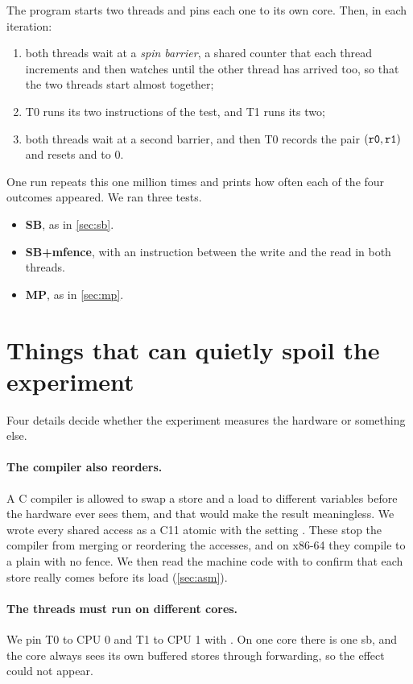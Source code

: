 The program starts two threads and pins each one to its own core. Then, in each iteration:
\begin{enumerate}
\item both threads wait at a \emph{spin barrier}, a shared counter that each thread increments and then watches until the other thread has arrived too, so that the two threads start almost together;
\item T0 runs its two instructions of the test, and T1 runs its two;
\item both threads wait at a second barrier, and then T0 records the pair $(\texttt{r0}, \texttt{r1})$ and resets  and  to 0.
\end{enumerate}
One run repeats this one million times and prints how often each of the four outcomes appeared. We ran three tests.
\begin{itemize}
\item \textbf{SB}, as in \cref{sec:sb}.
\item \textbf{SB+mfence}, with an  instruction between the write and the read in both threads.
\item \textbf{MP}, as in \cref{sec:mp}.
\end{itemize}

\section{Things that can quietly spoil the experiment}
\label{sec:pitfalls}

Four details decide whether the experiment measures the hardware or something else.

\paragraph{The compiler also reorders.} A C compiler is allowed to swap a store and a load to different variables before the hardware ever sees them, and that would make the result meaningless. We wrote every shared access as a C11 atomic with the setting . These stop the compiler from merging or reordering the accesses, and on x86-64 they compile to a plain  with no \gls{fence}. We then read the machine code with  to confirm that each store really comes before its load (\cref{sec:asm}).

\paragraph{The threads must run on different cores.} We pin T0 to CPU 0 and T1 to CPU 1 with . On one core there is one \gls{sb}, and the core always sees its own buffered stores through forwarding, so the effect could not appear.


